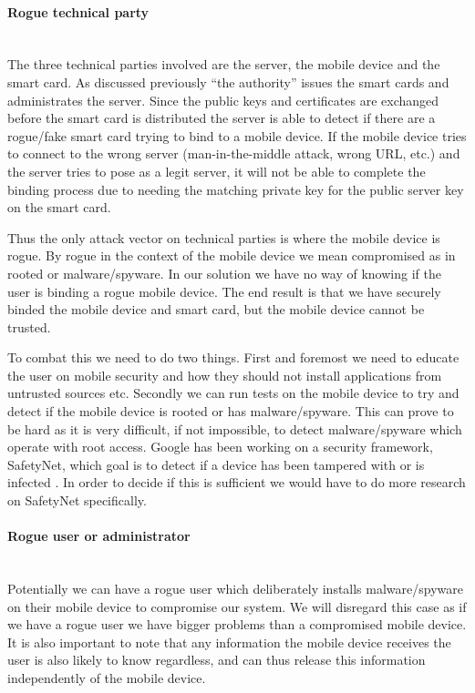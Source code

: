 \paragraph{Rogue technical party}\mbox{}\\
The three technical parties involved are the server, the mobile device and the smart card. As discussed previously ``the authority'' issues the smart cards and administrates the server. Since the public keys and certificates are exchanged before the smart card is distributed the server is able to detect if there are a rogue/fake smart card trying to bind to a mobile device. If the mobile device tries to connect to the wrong server (man-in-the-middle attack, wrong URL, etc.) and the server tries to pose as a legit server, it will not be able to complete the binding process due to needing the matching private key for the public server key on the smart card.

Thus the only attack vector on technical parties is where the mobile device is rogue. By rogue in the context of the mobile device we mean compromised as in rooted or malware/spyware. In our solution we have no way of knowing if the user is binding a rogue mobile device. The end result is that we have securely binded the mobile device and smart card, but the mobile device cannot be trusted.

To combat this we need to do two things. First and foremost we need to educate the user on mobile security and how they should not install applications from untrusted sources etc. Secondly we can run tests on the mobile device to try and detect if the mobile device is rooted or has malware/spyware. This can prove to be hard as it is very difficult, if not impossible, to detect malware/spyware which operate with root access. Google has been working on a security framework, SafetyNet, which goal is to detect if a device has been tampered with or is infected \cite{googleSafetynet}. In order to decide if this is sufficient we would have to do more research on SafetyNet specifically.

\paragraph{Rogue user or administrator}\mbox{}\\
Potentially we can have a rogue user which deliberately installs malware/spyware on their mobile device to compromise our system. We will disregard this case as if we have a rogue user we have bigger problems than a compromised mobile device. It is also important to note that any information the mobile device receives the user is also likely to know regardless, and can thus release this information independently of the mobile device.

